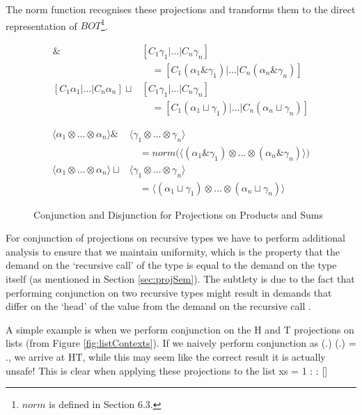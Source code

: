 \documentclass[preprint]{sigplanconf}
\DeclareMathOperator{\pmeet}{\&}
\begin{document}
The \<norm\> function recognises these projections and transforms them to the
direct representation of $BOT$\footnote{$norm$ is defined in
\cite{hinze1995projection} Section 6.3.}.

\begin{figure}
\noindent

\begin{align*}
[C_{1} \alpha_{1} | \dots | C_{n} \alpha_{n}] \pmeet& [C_{1} \gamma_{1} | \dots | C_{n} \gamma_{n}] \\
    & \quad = [C_{1} (\alpha_{1} \pmeet \gamma_{1}) | \dots | C_{n} (\alpha_{n} \pmeet \gamma_{n})] \\
[C_{1} \alpha_{1} | \dots | C_{n} \alpha_{n}] \sqcup& [C_{1} \gamma_{1} | \dots | C_{n} \gamma_{n}] \\
    & \quad = [C_{1} (\alpha_{1} \sqcup \gamma_{1}) | \dots | C_{n} (\alpha_{n} \sqcup \gamma_{n})]
\end{align*}%

\begin{align*}
\langle \alpha_{1} \otimes \dots \otimes \alpha_{n} \rangle \pmeet& \langle \gamma_{1} \otimes \dots \otimes \gamma_{n} \rangle \\
    & \quad = norm \big( \langle (\alpha_{1} \pmeet \gamma_{1}) \otimes \dots \otimes (\alpha_{n} \pmeet \gamma_{n})\rangle \big) \\
\langle \alpha_{1} \otimes \dots \otimes \alpha_{n} \rangle \sqcup& \langle \gamma_{1} \otimes \dots \otimes \gamma_{n} \rangle \\
    & \quad = \langle (\alpha_{1} \sqcup \gamma_{1}) \otimes \dots \otimes (\alpha_{n} \sqcup \gamma_{n})\rangle
\end{align*}
\caption[Conjunction and Disjunction for Projections 2]{Conjunction and Disjunction for Projections on Products and Sums}
\label{fig:conjDisSum}
\end{figure}

For conjunction of projections on recursive types we have to perform additional
analysis to ensure that we maintain uniformity, which is the property that the
demand on the `recursive call' of the type is equal to the demand on the type
itself (as mentioned in Section \ref{sec:projSem}). The subtlety is due to the
fact that performing conjunction on two recursive types might result in demands
that differ on the `head' of the value from the demand on the recursive call
\citep{kubiak, hinze1995projection}.

A simple example is when we perform conjunction on the \<H\> and \<T\>
projections on lists (from Figure \ref{fig:listContexts}). If we naively
perform conjunction as
\<(\mu\beta.\alpha) \pmeet (\mu\beta.\gamma)
= \mu\beta.\alpha \pmeet \gamma\>, we
arrive at \<HT\>, while this may seem like the correct result it is actually
unsafe! This is clear when applying these projections to the list \<xs = 1 :
\bot : []\>
\end{document}
